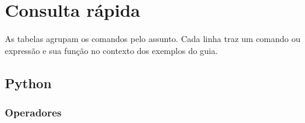\clearpage
\section{Consulta rápida}
\setlength{\LTpre}{4pt}
\setlength{\LTpost}{6pt}

As tabelas agrupam os comandos pelo assunto. Cada linha traz um comando ou expressão e sua função no contexto dos exemplos do guia.

\subsection{Python}
\subsubsection*{Operadores}

